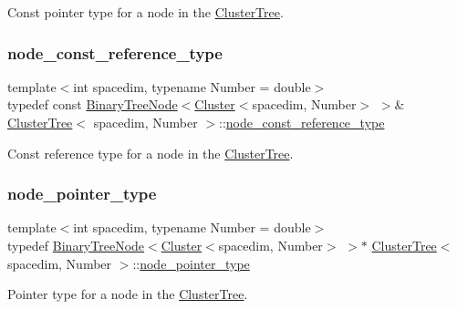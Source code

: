 Const pointer type for a node in the \hyperlink{classClusterTree}{Cluster\+Tree}. \mbox{\label{classClusterTree_ac40955dbfdb9b0beec67a0ecf6810c8f}} 
\subsubsection{\texorpdfstring{node\+\_\+const\+\_\+reference\+\_\+type}{node\_const\_reference\_type}}
{\footnotesize\ttfamily template$<$int spacedim, typename Number = double$>$ \\
typedef const \hyperlink{classBinaryTreeNode}{Binary\+Tree\+Node}$<$\hyperlink{classCluster}{Cluster}$<$spacedim, Number$>$ $>$\& \hyperlink{classClusterTree}{Cluster\+Tree}$<$ spacedim, Number $>$\+::\hyperlink{classClusterTree_ac40955dbfdb9b0beec67a0ecf6810c8f}{node\+\_\+const\+\_\+reference\+\_\+type}}

Const reference type for a node in the \hyperlink{classClusterTree}{Cluster\+Tree}. \mbox{\label{classClusterTree_ae4bb0fdc7ac559d7844d04a00ab3e9de}} 
\subsubsection{\texorpdfstring{node\+\_\+pointer\+\_\+type}{node\_pointer\_type}}
{\footnotesize\ttfamily template$<$int spacedim, typename Number = double$>$ \\
typedef \hyperlink{classBinaryTreeNode}{Binary\+Tree\+Node}$<$\hyperlink{classCluster}{Cluster}$<$spacedim, Number$>$ $>$$\ast$ \hyperlink{classClusterTree}{Cluster\+Tree}$<$ spacedim, Number $>$\+::\hyperlink{classClusterTree_ae4bb0fdc7ac559d7844d04a00ab3e9de}{node\+\_\+pointer\+\_\+type}}

Pointer type for a node in the \hyperlink{classClusterTree}{Cluster\+Tree}. \mbox{\label{classClusterTree_a257ebe4c6eab6581a0b65ba62487ae2c}} 
